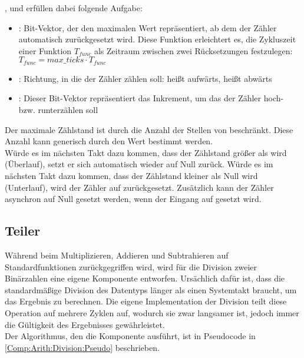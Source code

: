 ,  und  erfüllen dabei folgende Aufgabe:

\begin{itemize}
\item {}: Bit-Vektor, der den maximalen Wert repräsentiert, ab dem der Zähler automatisch zurückgesetzt wird.
Diese Funktion erleichtert es, die Zykluszeit einer Funktion $T_{func}$ als Zeitraum zwischen zwei Rücksetzungen festzulegen: $T_{func} = max\_ticks \cdot T_{func}$
\item {}: Richtung, in die der Zähler zählen soll:  heißt aufwärts,  heißt abwärts
  \item {}: Dieser Bit-Vektor repräsentiert das Inkrement, um das der Zähler hoch- bzw. runterzählen soll
\end{itemize}

Der maximale Zählstand ist durch die Anzahl der Stellen von  beschränkt.
Diese Anzahl kann generisch durch den Wert  bestimmt werden. \\
Würde es im nächsten Takt dazu kommen, dass der Zählstand größer als  wird (Überlauf), setzt er sich automatisch wieder auf Null zurück.
Würde es im nächsten Takt dazu kommen, dass der Zählstand kleiner als Null wird (Unterlauf), wird der Zähler auf  zurückgesetzt.
Zusätzlich kann der Zähler asynchron auf Null gesetzt werden, wenn der Eingang  auf  gesetzt wird.


\subsection{Teiler} \label{Comp:Arith:Division}

Während beim Multiplizieren, Addieren und Subtrahieren auf Standardfunktionen zurückgegriffen wird, wird für die Division zweier Binärzahlen eine eigene Komponente entworfen.
Ursächlich dafür ist, dass die standardmäßige Division des  Datentyps länger als einen Systemtakt braucht, um das Ergebnis zu berechnen.
Die eigene Implementation der Division teilt diese Operation auf mehrere Zyklen auf, wodurch sie zwar langsamer ist, jedoch immer die Gültigkeit des Ergebnisses gewährleistet.\\
Der Algorithmus, den die Komponente ausführt, ist in Pseudocode in \cref{Comp:Arith:Division:Pseudo} beschrieben.

